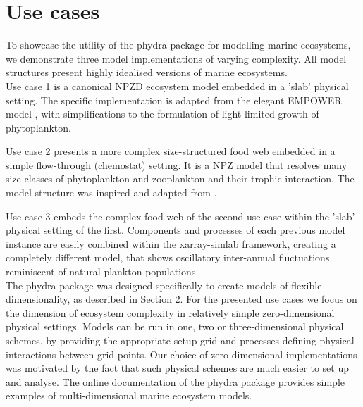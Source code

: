 \documentclass[journal abbreviation, manuscript]{copernicus}
\begin{document}
\section{Use cases}

To showcase the utility of the phydra package for modelling marine ecosystems, we demonstrate three model implementations of varying complexity.
All model structures present highly idealised versions of marine ecosystems.\\

Use case 1 is a canonical NPZD ecosystem model embedded in a 'slab' physical setting. The specific implementation is adapted from the elegant EMPOWER model \citep{Anderson2015c}, with simplifications to the formulation of light-limited growth of phytoplankton.

Use case 2 presents a more complex size-structured food web embedded in a simple flow-through (chemostat) setting. It is a NPZ model that resolves many size-classes of phytoplankton and zooplankton and their trophic interaction. The model structure was inspired and adapted from \citet{Banas2011b}. 

Use case 3 embeds the complex food web of the second use case within the 'slab' physical setting of the first. Components and processes of each previous model instance are easily combined within the xarray-simlab framework, creating a completely different model, that shows oscillatory inter-annual fluctuations reminiscent of natural plankton populations. \\


The phydra package was designed specifically to create models of flexible dimensionality, as described in Section 2. For the presented use cases we focus on the dimension of ecosystem complexity in relatively simple zero-dimensional physical settings. Models can be run in one, two or three-dimensional physical schemes, by providing the appropriate setup grid and processes defining physical interactions between grid points. Our choice of zero-dimensional implementations was motivated by the fact that such physical schemes are much easier to set up and analyse. The online documentation of the phydra package provides simple examples of multi-dimensional marine ecosystem models.\\
\end{document}
